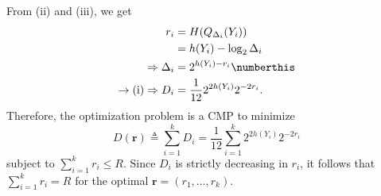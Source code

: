 \documentclass[
  coursecode={MTHE 477},
  assignmentname={Homework \homeworknumber},
  studentnumber=20053722,
  name={Bryan Hoang},
  draft,
]{
  ltxanswer%
}
\begin{document}
  \begin{questions}
    \setcounter{question}{\questionnumber}
    \addtocounter{question}{-1}
    \question[30]\
    \begin{parts}
      \part{}
      \begin{solution}
        From (ii) and (iii), we get
        \begin{align*}
          r_{i}                                    &= H(Q_{\Delta_{i}}(Y_{i}))                                 \\
                                                   &= h(Y_{i}) - \log_{2} \Delta_{i}                           \\
          \Rightarrow \Delta_{i}                   &= 2^{h(Y_{i}) - r_{i}}\numberthis\label{eq:bit-allocation} \\
          \rightarrow \text{(i)} \Rightarrow D_{i} &= \frac{1}{12} 2^{2 h(Y_{i})} 2^{-2 r_{i}}.
        \end{align*}
        Therefore, the optimization problem is a CMP to minimize
        \begin{equation}\label{eq:min-distortion}
          D(\mathbf{r}) \triangleq \sum_{i=1}^{k} D_{i} = \frac{1}{12} \sum_{i=1}^{k} 2^{2 h(Y_{i})} 2^{-2 r_{i}}
        \end{equation}
        subject to \(\sum_{i=1}^{k} r_{i} \le R\). Since \(D_{i}\) is strictly decreasing in \(r_{i}\), it follows that \(\sum_{i=1}^{k} r_{i} = R\) for the optimal \(\mathbf{r} = (r_{1}, \dotsc, r_{k})\).


\end{solution}
\end{parts}
\end{questions}
\end{document}
